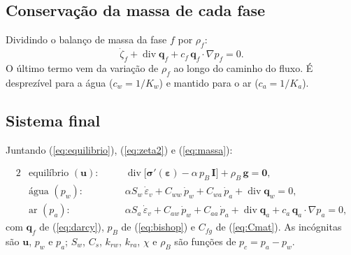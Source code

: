 \documentclass[11pt,a4paper]{article}
\newcommand{\vu}{\bm u}
\newcommand{\vq}{\bm q}
\newcommand{\vg}{\bm g}
\newcommand{\tsig}{\bm\sigma}
\newcommand{\teps}{\bm\varepsilon}
\newcommand{\tI}{\bm I}
\newcommand{\dv}{\operatorname{div}}
\begin{document}
\subsection{Conservação da massa de cada fase}
Dividindo o balanço de massa da fase $f$ por $\rho_f$:
\begin{equation}
\dot\zeta_f+\dv\vq_f+c_f\,\vq_f\cdot\nabla p_f=0 .
\label{eq:massa}
\end{equation}
O último termo vem da variação de $\rho_f$ ao longo do caminho do fluxo. É desprezível
para a água ($c_w=1/K_w$) e mantido para o ar ($c_a=1/K_a$).

\subsection{Sistema final}
Juntando (\ref{eq:equilibrio}), (\ref{eq:zeta2}) e (\ref{eq:massa}):

\begin{tcolorbox}[colback=black!3,colframe=black!45,boxrule=0.5pt,arc=2pt,
                  left=6pt,right=6pt,top=0pt,bottom=4pt]
\begin{alignat}{2}
&\text{equilíbrio } (\vu): &\quad&
  \dv\big[\tsig'(\teps)-\alpha\,p_B\,\tI\big]+\rho_B\,\vg=\bm 0,\label{eq:sis1}\\
&\text{água } (p_w): &&
  \alpha S_w\,\dot\varepsilon_v+C_{ww}\,\dot p_w+C_{wa}\,\dot p_a+\dv\vq_w=0,\label{eq:sis2}\\
&\text{ar } (p_a): &&
  \alpha S_a\,\dot\varepsilon_v+C_{aw}\,\dot p_w+C_{aa}\,\dot p_a+\dv\vq_a
  +c_a\,\vq_a\cdot\nabla p_a=0,\label{eq:sis3}
\end{alignat}
com $\vq_f$ de (\ref{eq:darcy}), $p_B$ de (\ref{eq:bishop}) e $C_{fg}$ de (\ref{eq:Cmat}).
As incógnitas são $\vu$, $p_w$ e $p_a$; $S_w$, $C_s$, $k_{rw}$, $k_{ra}$, $\chi$ e $\rho_B$
são funções de $p_c=p_a-p_w$.
\end{tcolorbox}
\end{document}
